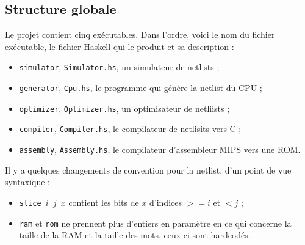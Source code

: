 \subsection{Structure globale}

Le projet contient cinq exécutables. Dans l'ordre, voici le nom du fichier exécutable, le fichier Haskell qui le produit et sa description :
\begin{itemize}
\item \texttt{simulator}, \texttt{Simulator.hs}, un simulateur de netlists ;
\item \texttt{generator}, \texttt{Cpu.hs}, le programme qui génère la netlist du CPU ;
\item \texttt{optimizer}, \texttt{Optimizer.hs}, un optimisateur de netliists ;
\item \texttt{compiler}, \texttt{Compiler.hs}, le compilateur de netlisits vers C ;
\item \texttt{assembly}, \texttt{Assembly.hs}, le compilateur d'assembleur MIPS vers une ROM.
\end{itemize}

Il y a quelques changements de convention pour la netlist, d'un point de vue syntaxique :
\begin{itemize}
\item \texttt{slice $i$ $j$ $x$} contient les bits de $x$ d'indices $>= i$ et $< j$ ;
\item \texttt{ram} et \texttt{rom} ne prennent plus d'entiers en paramètre en ce qui concerne la taille de la RAM et la taille des mots, ceux-ci sont hardcodés.
\end{itemize}

